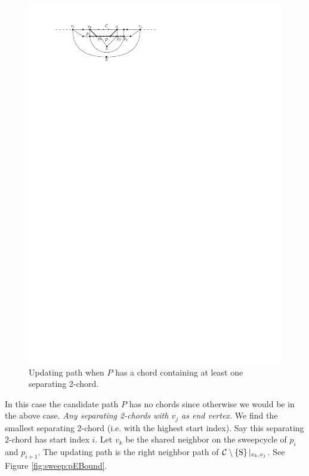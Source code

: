       \begin{figure}[h]
        \centering
        \includegraphics[scale=1]{unifiedAlgo/img/sweep/2chordInChordUpdate}
        \caption{Updating path when $P$ has a chord containing at least one separating 2-chord.}
        \label{fig:sweep:2chordInChordUpdate}
      \end{figure}

    In this case the candidate path $P$ has no chords since otherwise we would be in the above case.
    \emph{Any separating 2-chords with $v_j$ as end vertex.}
      We find the smallest separating 2-chord (i.e. with the highest start index). Say this separating $2$-chord has start index $i$.
      Let $v_k$ be the shared neighbor on the sweepcycle of $p_{i}$ and $p_{i +1}$. The updating path is the right neighbor path of $\mathcal{C} \setminus \left\lbrace {\mathrm{S}} \right\rbrace|_{v_k, v_j}$. See Figure \ref{fig:sweep:pEBound}.

